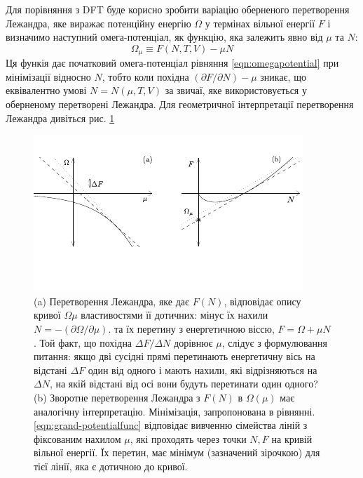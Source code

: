 Для порівняння з DFT буде корисно зробити варіацію оберненого перетворення Лежандра, яке виражає потенційну енергію $\Omega$ у термінах вільної енергії $F$ і визначимо наступний омега-потенціал, як функцію, яка залежить явно від $\mu$ та $N$:
\begin{equation}
	\label{eqn:grand-potentialfunc}
	\Omega_\mu \equiv F(N,T,V) - {\mu} N
\end{equation}
Ця функія дає початковий омега-потенціал рівняння \ref{eqn:omegapotential} при мінімізації відносно $N$, тобто коли похідна $(\partial{F}/\partial{N}) - \mu$ зникає, що еквівалентно умові $N = N(\mu,T,V)$ за звичаї, яке використовується у оберненому перетворені Лежандра. Для геометричної інтерпретації перетворення Лежандра дивіться рис. \ref{fig:legander_transform}
\begin{figure}[H]
  \centering
  \includegraphics[scale=2.5]{img/Legender_transform.pdf}
  \caption{(a) Перетворення Лежандра, яке дає $F(N)$, відповідає опису кривої $\Omega\mu$ властивостями її дотичних: мінус їх нахили $N = -(\partial{\Omega}/\partial{\mu})$. та їх перетину з енергетичною віссю, $F = \Omega + \mu N$. Той факт, що похідна $\Delta F / \Delta N$ дорівнює $\mu$, слідує з формулювання питання: якщо дві сусідні прямі перетинають енергетичну вісь на відстані $\Delta F$ один від одного і мають нахили, які відрізняються на $\Delta N$, на якій відстані від осі вони будуть перетинати один одного? (b) Зворотне перетворення Лежандра з $F(N)$ в $\Omega (\mu)$ має аналогічну інтерпретацію. Мінімізація, запропонована в рівнянні. \ref{eqn:grand-potentialfunc} відповідає вивченню сімейства ліній з фіксованим нахилом $\mu$, які проходять через точки $N, F$ на кривій вільної енергії. Їх перетин, має мінімум (зазначений зірочкою) для тієї лінії, яка є дотичною до кривої.}
  \label{fig:legander_transform}
\end{figure}

